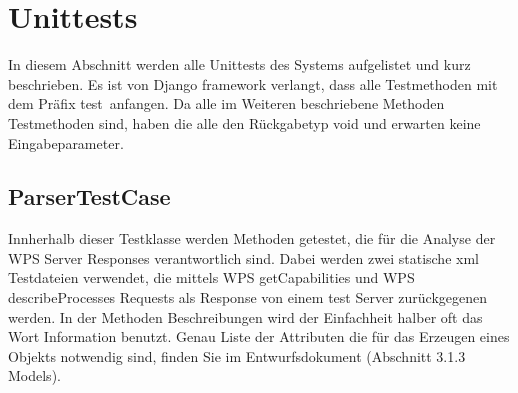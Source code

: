 \chapter{\gls{Unittest}s}
    \begin{flushleft}
    In diesem Abschnitt werden alle Unittests des Systems aufgelistet und kurz beschrieben. \newline
    Es ist von Django framework verlangt, dass alle Testmethoden mit dem Präfix \glqq test\grqq \ anfangen. \newline 
    Da alle im Weiteren beschriebene Methoden Testmethoden sind, haben die alle den Rückgabetyp void und erwarten keine Eingabeparameter.  
    \end{flushleft}
    
    \section{ParserTestCase}
    
    \begin{flushleft}
    Innherhalb dieser Testklasse werden Methoden getestet, die für die Analyse der WPS Server Responses verantwortlich sind. Dabei werden zwei statische xml Testdateien verwendet, die mittels WPS getCapabilities und WPS describeProcesses Requests als Response von einem test Server zurückgegenen werden. \newline
    In der Methoden Beschreibungen wird der Einfachheit halber oft das Wort \glqq Information \grqq benutzt. Genau Liste der Attributen die für das Erzeugen eines Objekts notwendig sind, finden Sie im Entwurfsdokument (Abschnitt 3.1.3 Models).
    \end{flushleft}
	
